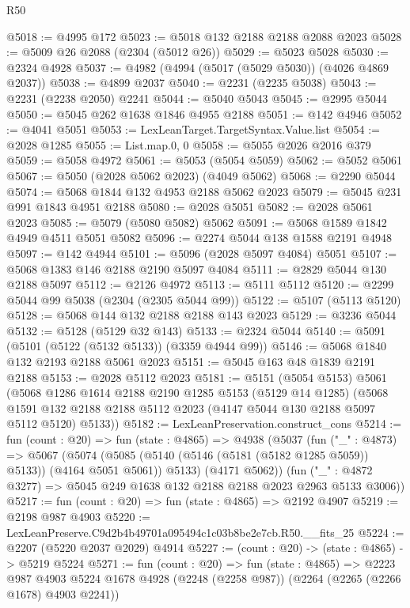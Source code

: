 \begin{lexlean}{R50}
\begin{coremodule}
@5018 := @4995 @172
@5023 := @5018 @132 @2188 @2188 @2088 @2023
@5028 := @5009 @26 @2088 (@2304 (@5012 @26))
@5029 := @5023 @5028
@5030 := @2324 @4928
@5037 := @4982 (@4994 (@5017 (@5029 @5030)) (@4026 @4869 @2037))
@5038 := @4899 @2037
@5040 := @2231 (@2235 @5038)
@5043 := @2231 (@2238 @2050) @2241
@5044 := @5040 @5043
@5045 := @2995 @5044
@5050 := @5045 @262 @1638 @1846 @4955 @2188
@5051 := @142 @4946
@5052 := @4041 @5051
@5053 := LexLeanTarget.TargetSyntax.Value.list
@5054 := @2028 @1285
@5055 := List.map.{0, 0}
@5058 := @5055 @2026 @2016 @379
@5059 := @5058 @4972
@5061 := @5053 (@5054 @5059)
@5062 := @5052 @5061
@5067 := @5050 (@2028 @5062 @2023) (@4049 @5062)
@5068 := @2290 @5044
@5074 := @5068 @1844 @132 @4953 @2188 @5062 @2023
@5079 := @5045 @231 @991 @1843 @4951 @2188
@5080 := @2028 @5051
@5082 := @2028 @5061 @2023
@5085 := @5079 (@5080 @5082) @5062
@5091 := @5068 @1589 @1842 @4949 @4511 @5051 @5082
@5096 := @2274 @5044 @138 @1588 @2191 @4948
@5097 := @142 @4944
@5101 := @5096 (@2028 @5097 @4084) @5051
@5107 := @5068 @1383 @146 @2188 @2190 @5097 @4084
@5111 := @2829 @5044 @130 @2188 @5097
@5112 := @2126 @4972
@5113 := @5111 @5112
@5120 := @2299 @5044 @99 @5038 (@2304 (@2305 @5044 @99))
@5122 := @5107 (@5113 @5120)
@5128 := @5068 @144 @132 @2188 @2188 @143 @2023
@5129 := @3236 @5044
@5132 := @5128 (@5129 @32 @143)
@5133 := @2324 @5044
@5140 := @5091 (@5101 (@5122 (@5132 @5133)) (@3359 @4944 @99))
@5146 := @5068 @1840 @132 @2193 @2188 @5061 @2023
@5151 := @5045 @163 @48 @1839 @2191 @2188
@5153 := @2028 @5112 @2023
@5181 := @5151
    (@5054 @5153)
    @5061
    (@5068
      @1286
      @1614
      @2188
      @2190
      @1285
      @5153
      (@5129 @14 @1285)
      (@5068 @1591 @132 @2188 @2188 @5112 @2023 (@4147 @5044 @130 @2188 @5097 @5112 @5120) @5133))
@5182 := LexLeanPreservation.construct_cons
@5214 := fun (count : @20) =>
  fun (state : @4865) =>
  @4938
    (@5037
      (fun ("_" : @4873) =>
      @5067
        (@5074 (@5085 (@5140 (@5146 (@5181 (@5182 @1285 @5059)) @5133)) (@4164 @5051 @5061)) @5133)
        (@4171 @5062))
      (fun ("_" : @4872 @3277) => @5045 @249 @1638 @132 @2188 @2188 @2023 @2963 @5133 @3006))
@5217 := fun (count : @20) => fun (state : @4865) => @2192 @4907
@5219 := @2198 @987 @4903
@5220 := LexLeanPreserve.C9d2b4b49701a095494c1c03b8be2e7cb.R50.__fits_25
@5224 := @2207 (@5220 @2037 @2029) @4914
@5227 := (count : @20) -> (state : @4865) -> @5219 @5224
@5271 := fun (count : @20) =>
  fun (state : @4865) =>
  @2223
    @987
    @4903
    @5224
    @1678
    @4928
    (@2248 (@2258 @987))
    (@2264 (@2265 (@2266 @1678) @4903 @2241))

\end{coremodule}
\end{lexlean}
